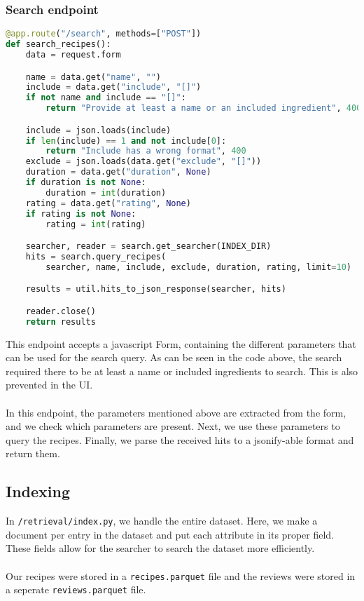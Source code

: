 \documentclass{article}
\begin{document}
\subsubsection{Search endpoint}
\begin{lstlisting}[language=Python]
@app.route("/search", methods=["POST"])
def search_recipes():
    data = request.form

    name = data.get("name", "")
    include = data.get("include", "[]")
    if not name and include == "[]":
        return "Provide at least a name or an included ingredient", 400

    include = json.loads(include)
    if len(include) == 1 and not include[0]:
        return "Include has a wrong format", 400
    exclude = json.loads(data.get("exclude", "[]"))
    duration = data.get("duration", None)
    if duration is not None:
        duration = int(duration)
    rating = data.get("rating", None)
    if rating is not None:
        rating = int(rating)

    searcher, reader = search.get_searcher(INDEX_DIR)
    hits = search.query_recipes(
        searcher, name, include, exclude, duration, rating, limit=10)

    results = util.hits_to_json_response(searcher, hits)

    reader.close()
    return results
\end{lstlisting}
This endpoint accepts a javascript Form, containing the different parameters
that can be used for the search query. As can be seen in the code above,
the search required there to be at least a name or included ingredients to search.
This is also prevented in the UI.
\\~\\
In this endpoint, the parameters mentioned above are extracted from the form,
and we check which parameters are present. Next, we use these parameters
to query the recipes.
Finally, we parse the received hits to a jsonify-able format and return them.

\subsection{Indexing}
In \texttt{/retrieval/index.py}, we handle the entire dataset. Here, we make a
document per entry in the dataset and put each attribute in its proper field.
These fields allow for the searcher to search the dataset more efficiently.\\~\\
Our recipes were stored in a \texttt{recipes.parquet} file and the reviews were
stored in a seperate \texttt{reviews.parquet} file.
\end{document}
